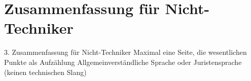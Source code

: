\chapter{Zusammenfassung für Nicht-Techniker}
\label{sec:nicht_tec}


3. Zusammenfassung für Nicht-Techniker
Maximal eine Seite, die wesentlichen Punkte als Aufzählung
Allgemeinverständliche Sprache oder Juristensprache (keinen technischen Slang)
